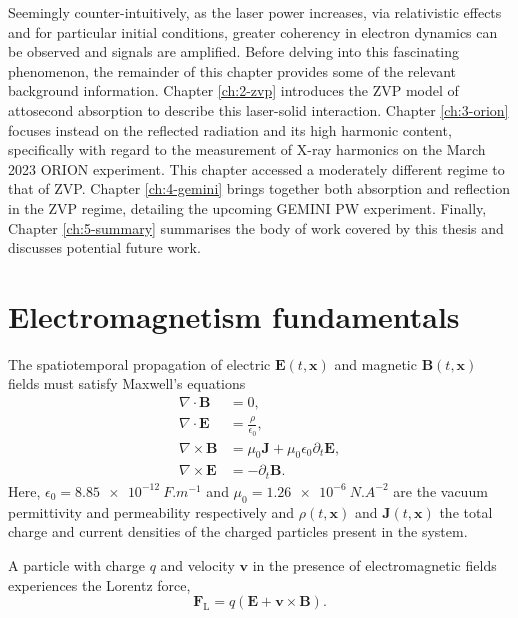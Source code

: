 Seemingly counter-intuitively, as the laser power increases, via relativistic effects and for particular initial conditions, greater coherency in electron dynamics can be observed and signals are amplified. Before delving into this fascinating phenomenon, the remainder of this chapter provides some of the relevant background information. Chapter \ref{ch:2-zvp} introduces the \ac{ZVP} model of attosecond absorption to describe this laser-solid interaction. Chapter \ref{ch:3-orion} focuses instead on the reflected radiation and its high harmonic content, specifically with regard to the measurement of X-ray harmonics on the March 2023 ORION experiment. This chapter accessed a moderately different regime to that of \ac{ZVP}. Chapter \ref{ch:4-gemini} brings together both absorption and reflection in the ZVP regime, detailing the upcoming GEMINI PW experiment. Finally, Chapter \ref{ch:5-summary} summarises the body of work covered by this thesis and discusses potential future work.

\section{Electromagnetism fundamentals}
The spatiotemporal propagation of electric $\mathbf{E}(t,\mathbf{x})$ and magnetic $\mathbf{B}(t,\mathbf{x})$ fields must satisfy Maxwell's equations \cite{chenIntroductionPlasmaPhysics2016}
\begin{subequations}
	\label{eq:intro-maxwell}
	\begin{align}
		\nabla \cdot \mathbf{B} &= 0, \label{eq:intro-B0} \\
		\nabla \cdot \mathbf{E} &= \frac{\rho}{\epsilon_0},\label{eq:intro-E0} \\
		\nabla \times \mathbf{B} &= \mu_0 \mathbf{J} + \mu_0 \epsilon_0 \partial_t \mathbf{E},\label{eq:intro-B1} \\
		\nabla \times \mathbf{E} &=-\partial_t \mathbf{B}. \label{eq:intro-E1}
	\end{align}
\end{subequations}
Here, $\epsilon_0 = \qty{8.85e-12}{F.m^{-1}}$ and $\mu_0 = \qty{1.26e-6}{N.A^{-2}}$ are the vacuum permittivity and permeability respectively and $\rho(t,\mathbf{x})$ and $\mathbf{J}(t,\mathbf{x})$ the total charge and current densities of the charged particles present in the system. 

A particle with charge $q$ and velocity $\mathbf{v}$ in the presence of electromagnetic fields experiences the Lorentz force,
\begin{equation}\label{eq:intro-Lorentz_force}
	\mathbf{F}_\mathrm{L} = q(\mathbf{E} + \mathbf{v} \times \mathbf{B}).
\end{equation}

